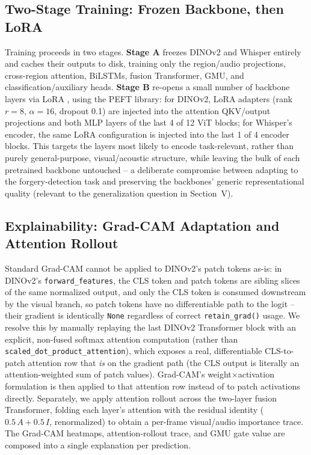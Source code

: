\documentclass[conference]{IEEEtran}
\begin{document}
\subsection{Two-Stage Training: Frozen Backbone, then LoRA}
Training proceeds in two stages. \textbf{Stage A} freezes DINOv2 and
Whisper entirely and caches their outputs to disk, training only the
region/audio projections, cross-region attention, BiLSTMs, fusion
Transformer, GMU, and classification/auxiliary heads. \textbf{Stage B}
re-opens a small number of backbone layers via LoRA \cite{hu2022lora},
using the PEFT library: for DINOv2, LoRA adapters (rank $r=8$,
$\alpha=16$, dropout 0.1) are injected into the attention QKV/output
projections and both MLP layers of the last 4 of 12 ViT blocks; for
Whisper's encoder, the same LoRA configuration is injected into the last 1
of 4 encoder blocks. This targets the layers most likely to encode
task-relevant, rather than purely general-purpose, visual/acoustic
structure, while leaving the bulk of each pretrained backbone untouched --
a deliberate compromise between adapting to the forgery-detection task and
preserving the backbones' generic representational quality (relevant to the
generalization question in Section~V).

\subsection{Explainability: Grad-CAM Adaptation and Attention Rollout}
Standard Grad-CAM \cite{selvaraju2017gradcam} cannot be applied to DINOv2's
patch tokens as-is: in DINOv2's \texttt{forward\_features}, the CLS token
and patch tokens are sibling slices of the same normalized output, and only
the CLS token is consumed downstream by the visual branch, so patch tokens
have no differentiable path to the logit -- their gradient is identically
\texttt{None} regardless of correct \texttt{retain\_grad()} usage. We
resolve this by manually replaying the last DINOv2 Transformer block with
an explicit, non-fused softmax attention computation (rather than
\texttt{scaled\_dot\_product\_attention}), which exposes a real,
differentiable CLS-to-patch attention row that \emph{is} on the gradient
path (the CLS output is literally an attention-weighted sum of patch
values). Grad-CAM's weight$\times$activation formulation is then applied to
that attention row instead of to patch activations directly. Separately, we
apply attention rollout \cite{abnar2020rollout} across the two-layer fusion
Transformer, folding each layer's attention with the residual identity
($0.5\,A + 0.5\,I$, renormalized) to obtain a per-frame visual/audio
importance trace. The Grad-CAM heatmaps, attention-rollout trace, and GMU
gate value are composed into a single explanation per prediction.
\end{document}
